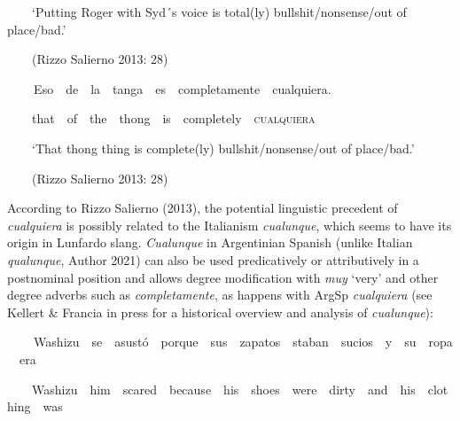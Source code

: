 \begin{styleStandard}
\ \ \ \ ‘Putting Roger with Syd´s voice is total(ly) bullshit/nonsense/out of place/bad.’
\end{styleStandard}

\begin{styleStandard}
\ \ \ \ (Rizzo Salierno 2013: 28)
\end{styleStandard}

\begin{styleStandard}
\textbf{\ \ }\ \ Eso\ \ de\ \ la\ \ tanga\ \ es\ \ completamente\ \ cualquiera.
\end{styleStandard}

\begin{styleStandard}
\ \ \ \ that\ \ of\ \ the\ \ thong\ \ is\ \ completely\ \ \textsc{cualquiera}
\end{styleStandard}

\begin{styleStandard}
\ \ \ \ ‘That thong thing is complete(ly) bullshit/nonsense/out of place/bad.’
\end{styleStandard}

\begin{styleStandard}
\ \ \ \ (Rizzo Salierno 2013: 28)
\end{styleStandard}

\begin{styleStandard}
According to Rizzo Salierno (2013), the potential linguistic precedent of \textit{cualquiera} is possibly related to the Italianism \textit{cualunque}, which seems to have its origin in Lunfardo slang. \textit{Cualunque} in Argentinian Spanish (unlike Italian \textit{qualunque}, Author 2021) can also be used predicatively or attributively in a postnominal position and allows degree modification with \textit{muy} ‘very’ and other degree adverbs such as \textit{completamente}, as happens with ArgSp \textit{cualquiera} (see Kellert \& Francia in press for a historical overview and analysis of \textit{cualunque}):
\end{styleStandard}

\begin{styleStandard}
\textbf{\ \ }\ \ Washizu\ \ se\ \ asustó\ \ porque\ \ sus\ \ zapatos\ \ staban\ \ sucios\ \ y\ \ su\ \ ropa\ \ era
\end{styleStandard}

\begin{styleStandard}
\ \ \ \ Washizu\ \ him\ \ scared\ \ because\ \ his\ \ shoes\ \ were\ \ dirty\ \ and\ \ his\ \ clothing\ \ was
\end{styleStandard}

